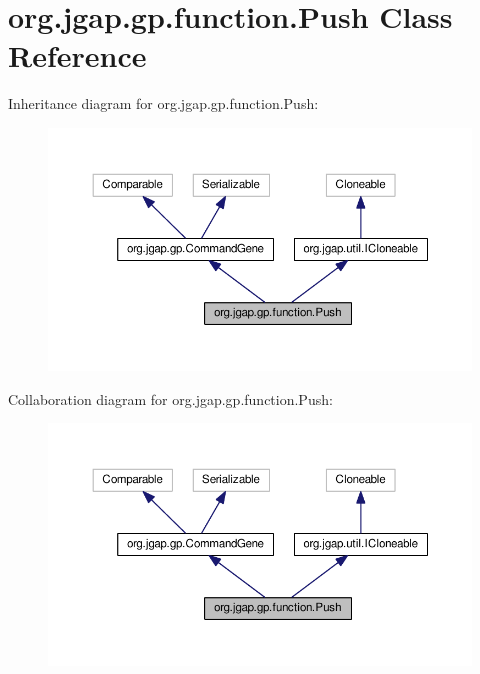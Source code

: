 \hypertarget{classorg_1_1jgap_1_1gp_1_1function_1_1_push}{\section{org.\-jgap.\-gp.\-function.\-Push Class Reference}
\label{classorg_1_1jgap_1_1gp_1_1function_1_1_push}
}


Inheritance diagram for org.\-jgap.\-gp.\-function.\-Push\-:
\nopagebreak
\begin{figure}[H]
\begin{center}
\leavevmode
\includegraphics[width=350pt]{classorg_1_1jgap_1_1gp_1_1function_1_1_push__inherit__graph}
\end{center}
\end{figure}


Collaboration diagram for org.\-jgap.\-gp.\-function.\-Push\-:
\nopagebreak
\begin{figure}[H]
\begin{center}
\leavevmode
\includegraphics[width=350pt]{classorg_1_1jgap_1_1gp_1_1function_1_1_push__coll__graph}
\end{center}
\end{figure}
